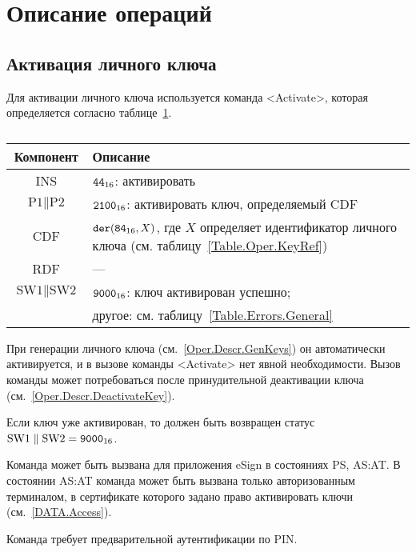 \section{Описание операций}\label{Oper.Descr}

\subsection{Активация личного ключа}\label{Oper.Descr.ActivateKey}

Для активации личного ключа используется команда <Activate>,
которая определяется согласно таблице~\ref{Table.Oper.ActivateCmd}.

\begin{table}[hbt]
\caption{}\label{Table.Oper.ActivateCmd}
\begin{tabular}{|c|p{14cm}|}
\hline
Компонент & Описание\\
\hline
\hline
INS & $\texttt{44}_{16}$: активировать\\
\hline
$\text{P1} \parallel \text{P2}$ & $\texttt{2100}_{16}$: 
активировать ключ, определяемый CDF\\
\hline
CDF &  $\texttt{der}(\texttt{84}_{16}, X)$,   
где $X$ определяет идентификатор личного ключа 
(см. таблицу~\ref{Table.Oper.KeyRef}) \\ 
\hline
RDF &  --- \\
\hline
$\text{SW1} \parallel \text{SW2}$ & $\texttt{9000}_{16}$: ключ активирован успешно; \\
  & другое: см. таблицу~\ref{Table.Errors.General} \\
\hline
\end{tabular}
\end{table}


При генерации личного ключа (см.~\ref{Oper.Descr.GenKeys})
он автоматически активируется, 
и в вызове команды <Activate> нет явной необходимости. 
Вызов команды может потребоваться после 
принудительной деактивации ключа (см.~\ref{Oper.Descr.DeactivateKey}).  

Если ключ уже активирован, то должен быть 
возвращен статус $\text{SW1} \parallel \text{SW2} = \texttt{9000}_{16}$.

Команда может быть вызвана для приложения eSign в состояниях PS, AS:AT.
В состоянии AS:AT команда может быть вызвана только
авторизованным терминалом, в сертификате которого задано 
право активировать ключи (см.~\ref{DATA.Access}).

Команда требует предварительной аутентификации по PIN.


